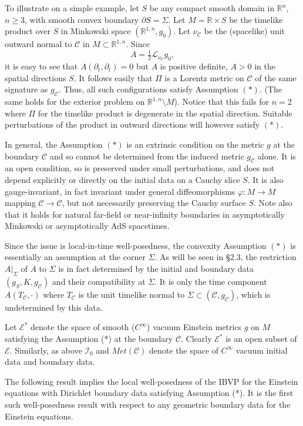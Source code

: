 \documentclass[10pt]{amsart}
\newcommand{\f}{\varphi}
\newcommand{\Si}{\Sigma}
\newcommand{\cC}{{\mathcal C}}
\newcommand{\cL}{{\mathcal L}}
\newcommand{\cE}{{\mathcal E}}
\newcommand{\cI}{\mathcal I}
\newcommand{\bR}{\mathbb R}
\newcommand{\p}{\partial}
\renewcommand{\to}{\rightarrow}
\newcommand{\<}{\langle}
\renewcommand{\>}{\rangle}
\theoremstyle{plain}
\theoremstyle{remark}
\theoremstyle{definition}
\numberwithin{equation}{section}
\begin{document}
\smallskip 

  To illustrate on a simple example, let $S$ be any compact smooth domain in $\bR^n$, $n \geq 3$, with smooth convex boundary $\p S = \Si$. Let $M = \bR \times S$ 
be the timelike product over $S$ in Minkowski space $(\bR^{1,n}, g_0)$. Let $\nu_{\cC}$ be the (spacelike) unit outward normal to $\cC$ in $M \subset \bR^{1,n}$. Since 
$$A = \tfrac{1}{2}\cL_{\nu_{\cC}}g_0,$$ 
it is easy to see that $A(\p_t,\p_t) = 0$ but $A$ is positive definite, $A > 0$ in the spatial directions $S$. It follows easily that $\Pi$ is a Lorentz metric on 
$\cC$ of the same signature as $g_{\cC}$. Thus, all such configurations satisfy Assumption $(*)$. (The same holds for the exterior problem on $\bR^{1,n}\setminus M$). 
Notice that this fails for $n = 2$ where $\Pi$ for the timelike product is degenerate in the spatial direction. Suitable perturbations of the product in outward directions 
will however satisfy $(*)$. 

  In general, the Assumption $(*)$ is an extrinsic condition on the metric $g$ at the boundary $\cC$ and so cannot be determined from the induced metric 
$g_{\cC}$ alone. It is an open condition, so is preserved under small perturbations, and does not depend explicitly or directly on the initial data on a Cauchy slice $S$. 
It is also gauge-invariant, in fact invariant under general diffeomorphisms $\f: M \to M$ mapping $\cC \to \cC$, but not necessarily preserving the Cauchy surface 
$S$. Note also that it holds for natural far-field or near-infinity boundaries in asymptotically Minkowski or asymptotically AdS spacetimes. 

  Since the issue is local-in-time well-posedness, the convexity Assumption $(*)$ is essentially an assumption at the corner $\Si$. As will be seen in 
\S 2.3, the restriction $A|_{\Si}$ of $A$ to $\Si$ is in fact determined by the initial and boundary data $(g_S, K, g_{\cC})$ and their compatibility at $\Si$. 
It is only the time component $A(T_{\cC}, \cdot)$ where $T_{\cC}$ is the unit timelike normal to $\Si \subset (\cC, g_{\cC})$, which is undetermined by 
this data. 

\medskip 

  Let $\cE^*$ denote the space of smooth ($C^{\infty}$) vacuum Einstein metrics $g$ on $M$ satisfying the Assumption (*) at the boundary $\cC$. 
Clearly $\cE^*$ is an open subset of $\cE$. Similarly, as above $\cI_0$ and $Met(\cC)$ denote the space of $C^{\infty}$ vacuum initial data and boundary data. 

   The following result implies the local well-posedness of the IBVP for the Einstein equations with Dirichlet boundary data satisfying 
Assumption (*). It is the first such well-posedness result with respect to any geometric boundary data for the Einstein equations. 
  
\end{document}
